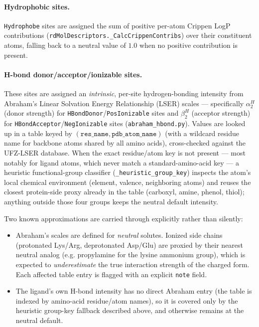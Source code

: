 \documentclass[11pt,a4paper]{article}
\begin{document}
\paragraph{Hydrophobic sites.} \texttt{Hydrophobe} sites are assigned the sum of positive per-atom Crippen LogP contributions (\texttt{rdMolDescriptors.\_CalcCrippenContribs}) over their constituent atoms, falling back to a neutral value of $1.0$ when no positive contribution is present.

\paragraph{H-bond donor/acceptor/ionizable sites.} These sites are assigned an \emph{intrinsic}, per-site hydrogen-bonding intensity from Abraham's Linear Solvation Energy Relationship (LSER) scales — specifically $\alpha_2^H$ (donor strength) for \texttt{HBondDonor}/\texttt{PosIonizable} sites and $\beta_2^H$ (acceptor strength) for \texttt{HBondAcceptor}/\texttt{NegIonizable} sites (\texttt{abraham\_hbond.py}). Values are looked up in a table keyed by $(\texttt{res\_name}, \texttt{pdb\_atom\_name})$ (with a wildcard residue name for backbone atoms shared by all amino acids), cross-checked against the UFZ-LSER database. When the exact residue/atom key is not present — most notably for ligand atoms, which never match a standard-amino-acid key — a heuristic functional-group classifier (\texttt{\_heuristic\_group\_key}) inspects the atom's local chemical environment (element, valence, neighboring atoms) and reuses the closest protein-side proxy already in the table (carboxyl, amine, phenol, thiol); anything outside those four groups keeps the neutral default intensity.

Two known approximations are carried through explicitly rather than silently:
\begin{itemize}[leftmargin=1.5em]
    \item Abraham's scales are defined for \emph{neutral} solutes. Ionized side chains (protonated Lys/Arg, deprotonated Asp/Glu) are proxied by their nearest neutral analog (e.g. propylamine for the lysine ammonium group), which is expected to \emph{underestimate} the true interaction strength of the charged form. Each affected table entry is flagged with an explicit \texttt{note} field.
    \item The ligand's own H-bond intensity has no direct Abraham entry (the table is indexed by amino-acid residue/atom names), so it is covered only by the heuristic group-key fallback described above, and otherwise remains at the neutral default.
\end{itemize}
\end{document}
